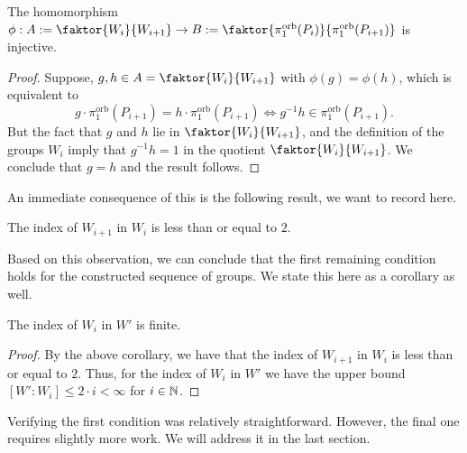 \begin{lemma}\label{lem:index}
    The homomorphism \(\phi : A := \faktor{W_i}{W_{i+1}} \to B := \faktor{\pi_1^{\text{orb}}(P_i)}{\pi_1^{\text{orb}}(P_{i+1})}\) is injective.
\end{lemma}
\begin{proof}
    Suppose, \(g,h \in A = \faktor{W_i}{W_{i+1}}\) with \(\phi(g) = \phi(h)\), which is equivalent to
    \[g \cdot \pi_1^{\text{orb}}(P_{i+1}) = h \cdot \pi_1^{\text{orb}}(P_{i+1}) \iff g^{-1}h \in \pi_1^{\text{orb}}(P_{i+1}).\]
    But the fact that \(g\) and \(h\) lie in \(\faktor{W_i}{W_{i+1}}\), and the definition of the groups \(W_i\) imply that \(g^{-1}h = 1\) in the quotient \(\faktor{W_i}{W_{i+1}}\).
    We conclude that \(g = h\) and the result follows. 
\end{proof}

An immediate consequence of this is the following result, we want to record here.

\begin{corollary}
    The index of \(W_{i+1}\) in \(W_i\) is less than or equal to \(2\).
\end{corollary}

Based on this observation, we can conclude that the first remaining condition holds for the constructed sequence of groups.
We state this here as a corollary as well.

\begin{corollary}
    The index of \(W_i\) in \(W'\) is finite.
\end{corollary}
\begin{proof}
    By the above corollary, we have that the index of \(W_{i+1}\) in \(W_i\) is less than or equal to \(2\).
    Thus, for the index of \(W_i\) in \(W'\) we have the upper bound \([W':W_i] \leq 2 \cdot i < \infty\) for \(i \in \mathbb{N}\).
\end{proof}

Verifying the first condition was relatively straightforward.
However, the final one requires slightly more work.
We will address it in the last section.



